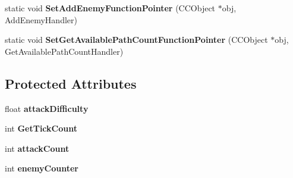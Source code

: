 \begin{DoxyCompactItemize}
\item 
\hypertarget{class_j_g___attack_wave___base_af39c604d6b9eb777d7055d1db90e42d4}{static void {\bfseries Set\-Add\-Enemy\-Function\-Pointer} (C\-C\-Object $\ast$obj, Add\-Enemy\-Handler)}\label{class_j_g___attack_wave___base_af39c604d6b9eb777d7055d1db90e42d4}

\item 
\hypertarget{class_j_g___attack_wave___base_a041bc10cdf5d34df0358118dbfe7e737}{static void {\bfseries Set\-Get\-Available\-Path\-Count\-Function\-Pointer} (C\-C\-Object $\ast$obj, Get\-Available\-Path\-Count\-Handler)}\label{class_j_g___attack_wave___base_a041bc10cdf5d34df0358118dbfe7e737}

\end{DoxyCompactItemize}
\subsection*{Protected Attributes}
\begin{DoxyCompactItemize}
\item 
\hypertarget{class_j_g___attack_wave___base_a12c589b66ecc6b81d2e3ef5b97ab6547}{float {\bfseries attack\-Difficulty}}\label{class_j_g___attack_wave___base_a12c589b66ecc6b81d2e3ef5b97ab6547}

\item 
\hypertarget{class_j_g___attack_wave___base_a4f054cf71992c3d7ea309e49f3e2f27b}{int {\bfseries Get\-Tick\-Count}}\label{class_j_g___attack_wave___base_a4f054cf71992c3d7ea309e49f3e2f27b}

\item 
\hypertarget{class_j_g___attack_wave___base_ab3858590ce216380294c5efaa6ba4fb5}{int {\bfseries attack\-Count}}\label{class_j_g___attack_wave___base_ab3858590ce216380294c5efaa6ba4fb5}

\item 
\hypertarget{class_j_g___attack_wave___base_a3efc437d3866dd40d6b0dc4bb145c468}{int {\bfseries enemy\-Counter}}\label{class_j_g___attack_wave___base_a3efc437d3866dd40d6b0dc4bb145c468}

\end{DoxyCompactItemize}
